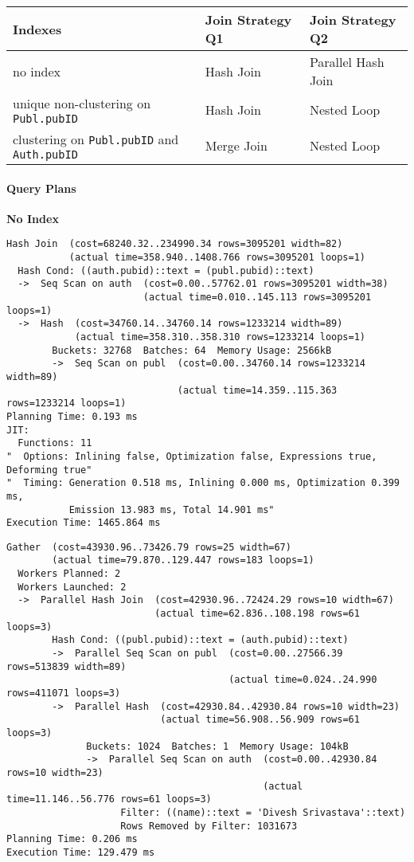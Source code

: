\documentclass[11pt]{scrartcl}
\begin{document}
\begin{table}[H]
  \centering
  \begin{tabular}{l|l|l}
    Indexes & Join Strategy Q1 & Join Strategy Q2 \tabularnewline
    \hline
    no index & Hash Join & Parallel Hash Join \tabularnewline
    unique non-clustering on \texttt{Publ.pubID} & Hash Join & Nested Loop
      \tabularnewline
    clustering on \texttt{Publ.pubID} and \texttt{Auth.pubID} & Merge Join & Nested Loop
      \tabularnewline
  \end{tabular}
\end{table}

\paragraph{Query Plans}

\textbf{No Index}

{\small
\parskip0pt\begin{verbatim}
Hash Join  (cost=68240.32..234990.34 rows=3095201 width=82)
           (actual time=358.940..1408.766 rows=3095201 loops=1)
  Hash Cond: ((auth.pubid)::text = (publ.pubid)::text)
  ->  Seq Scan on auth  (cost=0.00..57762.01 rows=3095201 width=38)
                        (actual time=0.010..145.113 rows=3095201 loops=1)
  ->  Hash  (cost=34760.14..34760.14 rows=1233214 width=89)
            (actual time=358.310..358.310 rows=1233214 loops=1)
        Buckets: 32768  Batches: 64  Memory Usage: 2566kB
        ->  Seq Scan on publ  (cost=0.00..34760.14 rows=1233214 width=89)
                              (actual time=14.359..115.363 rows=1233214 loops=1)
Planning Time: 0.193 ms
JIT:
  Functions: 11
"  Options: Inlining false, Optimization false, Expressions true, Deforming true"
"  Timing: Generation 0.518 ms, Inlining 0.000 ms, Optimization 0.399 ms,
           Emission 13.983 ms, Total 14.901 ms"
Execution Time: 1465.864 ms
\end{verbatim}}

{\small
\parskip0pt\begin{verbatim}
Gather  (cost=43930.96..73426.79 rows=25 width=67)
        (actual time=79.870..129.447 rows=183 loops=1)
  Workers Planned: 2
  Workers Launched: 2
  ->  Parallel Hash Join  (cost=42930.96..72424.29 rows=10 width=67)
                          (actual time=62.836..108.198 rows=61 loops=3)
        Hash Cond: ((publ.pubid)::text = (auth.pubid)::text)
        ->  Parallel Seq Scan on publ  (cost=0.00..27566.39 rows=513839 width=89)
                                       (actual time=0.024..24.990 rows=411071 loops=3)
        ->  Parallel Hash  (cost=42930.84..42930.84 rows=10 width=23)
                           (actual time=56.908..56.909 rows=61 loops=3)
              Buckets: 1024  Batches: 1  Memory Usage: 104kB
              ->  Parallel Seq Scan on auth  (cost=0.00..42930.84 rows=10 width=23)
                                             (actual time=11.146..56.776 rows=61 loops=3)
                    Filter: ((name)::text = 'Divesh Srivastava'::text)
                    Rows Removed by Filter: 1031673
Planning Time: 0.206 ms
Execution Time: 129.479 ms
\end{verbatim}}
\end{document}
